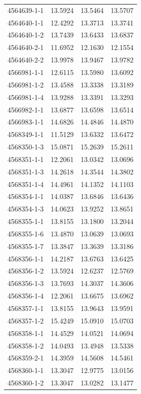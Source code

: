 \begin{longtable}{lrrr}
4564639-1-1 & 13.5924 & 13.5464 & 13.5707 \\
4564640-1-1 & 12.4292 & 13.3713 & 13.3741 \\
4564640-1-2 & 13.7439 & 13.6433 & 13.6837 \\
4564640-2-1 & 11.6952 & 12.1630 & 12.1554 \\
4564640-2-2 & 13.9978 & 13.9467 & 13.9782 \\
4566981-1-1 & 12.6115 & 13.5980 & 13.6092 \\
4566981-1-2 & 13.4588 & 13.3338 & 13.3189 \\
4566981-1-4 & 13.9288 & 13.3391 & 13.3293 \\
4566982-1-1 & 13.6877 & 13.6598 & 13.6514 \\
4566983-1-1 & 14.6826 & 14.4846 & 14.4870 \\
4568349-1-1 & 11.5129 & 13.6332 & 13.6472 \\
4568350-1-3 & 15.0871 & 15.2639 & 15.2611 \\
4568351-1-1 & 12.2061 & 13.0342 & 13.0696 \\
4568351-1-3 & 14.2618 & 14.3544 & 14.3802 \\
4568351-1-4 & 14.4961 & 14.1352 & 14.1103 \\
4568354-1-1 & 14.0387 & 13.6846 & 13.6436 \\
4568354-1-3 & 14.0623 & 13.9252 & 13.8651 \\
4568355-1-1 & 13.8155 & 13.1800 & 13.2044 \\
4568355-1-6 & 13.4870 & 13.0639 & 13.0693 \\
4568355-1-7 & 13.3847 & 13.3639 & 13.3186 \\
4568356-1-1 & 14.2187 & 13.6763 & 13.6425 \\
4568356-1-2 & 13.5924 & 12.6237 & 12.5769 \\
4568356-1-3 & 13.7693 & 14.3037 & 14.3606 \\
4568356-1-4 & 12.2061 & 13.6675 & 13.6962 \\
4568357-1-1 & 13.8155 & 13.9643 & 13.9591 \\
4568357-1-2 & 15.4249 & 15.0910 & 15.0703 \\
4568358-1-1 & 14.4529 & 14.0521 & 14.0694 \\
4568358-1-2 & 14.0493 & 13.4948 & 13.5338 \\
4568359-2-1 & 14.3959 & 14.5608 & 14.5461 \\
4568360-1-1 & 13.3047 & 12.9775 & 13.0156 \\
4568360-1-2 & 13.3047 & 13.0282 & 13.1477 \\

\end{longtable}
